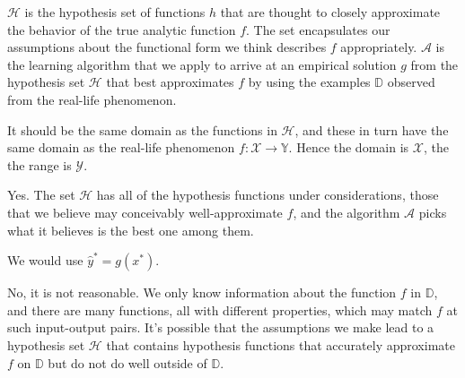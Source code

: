\documentclass[12pt]{article}
\begin{document}
\begin{enumerate}

$\mathcal{H}$ is the hypothesis set of functions $h$ that are thought to closely approximate
the behavior of the true analytic function $f$. The set encapsulates our assumptions about
the functional form we think describes $f$ appropriately. $\mathcal{A}$ is the learning algorithm
that we apply to arrive at an empirical solution $g$ from the hypothesis set $\mathcal{H}$ that best
approximates $f$ by using the examples $\mathbb{D}$ observed from the real-life phenomenon.


It should be the same domain as the functions in $\mathcal{H}$, and these in turn have the
same domain as the real-life phenomenon $f:\mathcal{X}\to\mathbb{Y}$. Hence the domain
is $\mathcal{X}$, the the range is $\mathcal{Y}$.


Yes. The set $\mathcal{H}$ has all of the hypothesis functions under considerations, those
that we believe may conceivably well-approximate $f$, and the algorithm $\mathcal{A}$
picks what it believes is the best one among them.


We would use $\hat{y}^* = g(x^*)$.


No, it is not reasonable. We only know information about the function $f$ in $\mathbb{D}$,
and there are many functions, all with different properties, which may match $f$ at
such input-output pairs. It's possible that the assumptions we make lead to a hypothesis
set $\mathcal{H}$ that contains hypothesis functions that accurately approximate $f$ on
$\mathbb{D}$ but do not do well outside of $\mathbb{D}$.


\end{enumerate}
\end{document}
